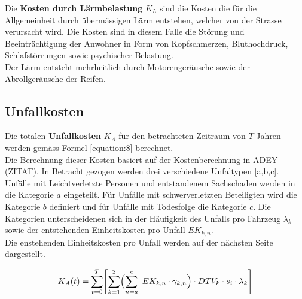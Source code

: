 Die \textbf{Kosten durch Lärmbelastung} $K_{L}$ sind die Kosten die für die Allgemeinheit durch übermässigen Lärm entstehen, welcher von der Strasse verursacht wird. 
Die Kosten sind in diesem Falle die Störung und Beeinträchtigung der Anwohner in Form von Kopfschmerzen, Bluthochdruck, Schlafstörrungen sowie psychischer Belastung. \\
Der Lärm entsteht mehrheitlich durch Motorengeräusche sowie der Abrollgeräusche der Reifen. 

\newpage

\subsection{Unfallkosten}
\label{sec:Unfallkosten}

Die totalen \textbf{Unfallkosten} $K_{A}$ für den betrachteten Zeitraum von $T$ Jahren werden gemäss Formel \ref{equation:8} berechnet. \\
Die Berechnung dieser Kosten basiert auf der Kostenberechnung in ADEY (ZITAT).
In Betracht gezogen werden drei verschiedene Unfaltypen [a,b,c]. Unfälle mit Leichtverletzte Personen und entstandenem Sachschaden werden in die Kategorie $a$ eingeteilt. Für Unfälle mit schwerverletzten Beteiligten wird die Kategorie $b$ definiert und für Unfälle mit Todesfolge die Kategorie $c$. Die Kategorien unterscheidenen sich in der Häufigkeit des Unfalls pro Fahrzeug \( \lambda_{k} \) sowie der entstehenden Einheitskosten pro Unfall $EK_{k,n}$. \\
Die enstehenden Einheitskosten pro Unfall werden auf der nächsten Seite dargestellt.

\begin{equation}
K_{A}(t) = \sum_{t=0}^T \Biggl[ \sum_{k=1}^2 \Bigl( \sum_{n=a}^c \ EK_{k,n} \cdot \gamma_{k,n} \Bigr) \cdot DTV_{k} \cdot s_i \cdot \lambda_{k} \Biggr] 
\label{equation:8}
\end{equation}

